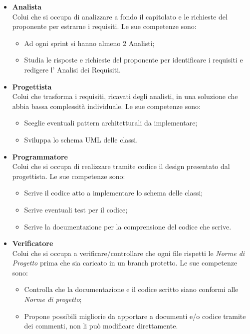 \begin{itemize}
                    \item \textbf{Analista}\\
                    Colui che si occupa di analizzare a fondo il capitolato e le richieste del proponente per estrarne i requisiti.
                    Le sue competenze sono:
                    \begin{itemize}
                        \item Ad ogni sprint si hanno almeno 2 Analisti;
                        \item Studia le risposte e richieste del proponente per identificare i requisiti e redigere l' Analisi dei Requisiti.
                    \end{itemize}
                    \item \textbf{Progettista}\\
                    Colui che trasforma i requisiti, ricavati degli analisti, in una soluzione che abbia bassa complessità individuale.
                    Le sue competenze sono:
                    \begin{itemize}
                        \item Sceglie eventuali pattern architetturali da implementare;
                        \item Sviluppa lo schema UML delle classi.
                    \end{itemize}
                    \item \textbf{Programmatore}\\
                    Colui che si occupa di realizzare tramite codice il design presentato dal progettista.
                    Le sue competenze sono:
                    \begin{itemize}
                        \item Scrive il codice atto a implementare lo schema delle classi;
                        \item Scrive eventuali test per il codice;
                        \item Scrive la documentazione per la comprensione del codice che scrive.
                    \end{itemize}
                    \item \textbf{Verificatore}\\
                    Colui che si occupa a verificare/controllare che ogni file rispetti le \textit{Norme di Progetto} prima che sia caricato in un branch protetto.
                    Le sue competenze sono:
                    \begin{itemize}
                        \item Controlla che la documentazione e il codice scritto siano conformi alle \textit{Norme di progetto};
                        \item Propone possibili migliorie da apportare a documenti e/o codice tramite dei commenti, non li può modificare direttamente.
                    \end{itemize}
            \end{itemize}

